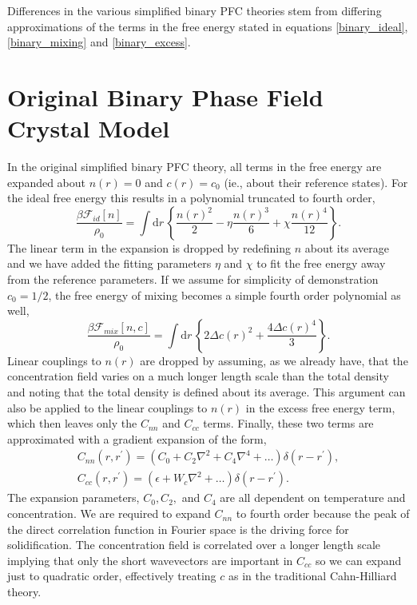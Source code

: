 \documentclass[showkeys, prb, reprint]{revtex4-1}
\renewcommand{\d}{\delta}       %
\newcommand{\F}{\mathcal{F}}    %
\renewcommand{\l}{\left}        %
\renewcommand{\r}{\right}       %
\newcommand{\f}{\frac}          %
\newcommand{\integrate}[1]{\int \mathrm{d}#1\,}
\begin{document}
Differences in the various simplified binary PFC theories stem from differing
approximations of the terms in the free energy stated in equations 
\ref{binary_ideal}, \ref{binary_mixing} and \ref{binary_excess}.

\section{Original Binary Phase Field Crystal Model} %

In the original simplified binary PFC theory, all terms in the free energy are
expanded about $n(r) = 0$ and $c(r) = c_0$ (ie., about their reference states).
For the ideal free energy this results in a polynomial truncated to fourth
order,
%
\begin{equation}
    \label{ideal_expansion}
    \f{\beta\F_{id}[n]}{\rho_0} = \integrate{r}
    \l\lbrace \f{n(r)^2}{2} - \eta\f{n(r)^3}{6} + \chi\f{n(r)^4}{12} \r\rbrace.
\end{equation}
%
The linear term in the expansion is dropped by redefining $n$ about its average
and we have added the fitting parameters $\eta$ and $\chi$ to fit the free
energy away from the reference parameters. If we assume for simplicity of
demonstration $c_0 = 1/2$, the free energy of mixing becomes a simple fourth
order polynomial as well,
%
\begin{equation}
    \f{\beta\F_{mix}[n, c]}{\rho_0} = \integrate{r} \l\lbrace
       2\Delta c(r)^2 + \f{4\Delta c(r)^4}{3}
    \r\rbrace.
\end{equation}
%
Linear couplings to $n(r)$ are dropped by assuming, as we already have, that
the concentration field varies on a much longer length scale than the total
density and noting that the total density is defined about its average. This
argument can also be applied to the linear couplings to $n(r)$ in the excess free
energy term, which then leaves only the $C_{nn}$ and $C_{cc}$ terms. Finally, these
two terms are approximated with a gradient expansion of the form,
%
\begin{gather}
    C_{nn}(r, r^\prime) = \l( C_0 + C_2 \nabla^2 + C_4 \nabla^4 + \dots\r)
        \d(r - r^\prime), \\
    C_{cc}(r, r^\prime) = \l(\epsilon + W_c \nabla^2 + \dots\r)
        \d(r - r^\prime).
\end{gather}
%
The expansion parameters, $C_0, C_2,$ and $C_4$ are all dependent on
temperature and concentration. We are required to expand $C_{nn}$ to fourth
order because the peak of the direct correlation function in Fourier space is
the driving force for solidification.  The concentration field is correlated
over a longer length scale implying that only the short wavevectors are
important in $C_{cc}$ so we can expand just to quadratic order, effectively
treating $c$ as in the traditional Cahn-Hilliard theory.
\end{document}
